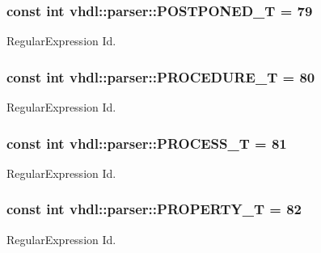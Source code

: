 \subsubsection[{P\+O\+S\+T\+P\+O\+N\+E\+D\+\_\+\+T}]{\setlength{\rightskip}{0pt plus 5cm}const int vhdl\+::parser\+::\+P\+O\+S\+T\+P\+O\+N\+E\+D\+\_\+\+T = 79}\label{namespacevhdl_1_1parser_a4ab70c303b2c7435cb9b276be3bad171}
Regular\+Expression Id. \hypertarget{namespacevhdl_1_1parser_abd3d0ace2e5d2c7c7c91101bbcc7cff8}{}
\subsubsection[{P\+R\+O\+C\+E\+D\+U\+R\+E\+\_\+\+T}]{\setlength{\rightskip}{0pt plus 5cm}const int vhdl\+::parser\+::\+P\+R\+O\+C\+E\+D\+U\+R\+E\+\_\+\+T = 80}\label{namespacevhdl_1_1parser_abd3d0ace2e5d2c7c7c91101bbcc7cff8}
Regular\+Expression Id. \hypertarget{namespacevhdl_1_1parser_a2270104e8ca2867c11f2f03a84bfafce}{}
\subsubsection[{P\+R\+O\+C\+E\+S\+S\+\_\+\+T}]{\setlength{\rightskip}{0pt plus 5cm}const int vhdl\+::parser\+::\+P\+R\+O\+C\+E\+S\+S\+\_\+\+T = 81}\label{namespacevhdl_1_1parser_a2270104e8ca2867c11f2f03a84bfafce}
Regular\+Expression Id. \hypertarget{namespacevhdl_1_1parser_a908cdf65643fdc2a07173a5e636c24fc}{}
\subsubsection[{P\+R\+O\+P\+E\+R\+T\+Y\+\_\+\+T}]{\setlength{\rightskip}{0pt plus 5cm}const int vhdl\+::parser\+::\+P\+R\+O\+P\+E\+R\+T\+Y\+\_\+\+T = 82}\label{namespacevhdl_1_1parser_a908cdf65643fdc2a07173a5e636c24fc}
Regular\+Expression Id. \hypertarget{namespacevhdl_1_1parser_aa6644820445a33e93a8e97e637a2c5c1}{}
